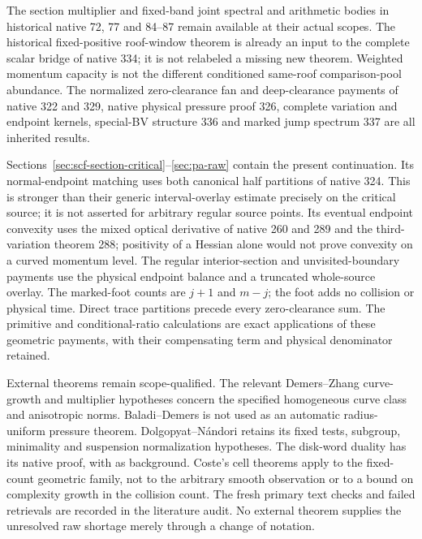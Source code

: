 \documentclass[11pt,reqno]{amsart}
\numberwithin{equation}{section}
\theoremstyle{definition}\newtheorem{definition}[theorem]{Definition}
\theoremstyle{remark}\newtheorem{remark}[theorem]{Remark}
\begin{document}
The section multiplier and fixed-band joint spectral and
arithmetic bodies in historical native 72, 77 and 84--87 remain
available at their actual scopes. The historical fixed-positive
roof-window theorem is already an input to the complete scalar
bridge of native 334; it is not relabeled a missing new theorem.
Weighted momentum capacity is not the different conditioned
same-roof comparison-pool abundance. The normalized
zero-clearance fan and deep-clearance payments of native 322
and 329, native physical pressure proof 326, complete variation
and endpoint kernels, special-BV structure 336 and marked
jump spectrum 337 are all inherited results.

Sections~\ref{sec:scf-section-critical}--\ref{sec:pa-raw}
contain the present continuation. Its normal-endpoint matching
uses both canonical half partitions of native 324. This is
stronger than their generic interval-overlay estimate precisely
on the critical source; it is not asserted for arbitrary
regular source points. Its eventual endpoint convexity uses
the mixed optical derivative of native 260 and 289 and the
third-variation theorem 288; positivity of a Hessian alone
would not prove convexity on a curved momentum level.
The regular interior-section and unvisited-boundary payments
use the physical endpoint balance and a truncated whole-source
overlay. The marked-foot counts are $j+1$ and $m-j$; the foot
adds no collision or physical time. Direct trace partitions
precede every zero-clearance sum. The primitive and
conditional-ratio calculations are exact
applications of these geometric payments, with their
compensating term and physical denominator retained.

External theorems remain scope-qualified. The relevant
Demers--Zhang curve-growth and multiplier hypotheses
\cite{DZUniform} concern the specified homogeneous curve
class and anisotropic norms. Baladi--Demers\cite{BDPressure}
is not used as an automatic radius-uniform pressure theorem.
Dolgopyat--N\'andori\cite{DNFlow} retains its fixed tests,
subgroup, minimality and suspension normalization hypotheses.
The disk-word duality has its native proof, with
\cite{BVNotes} as background. Coste's cell theorems
\cite{CosteOM} apply to the fixed-count geometric family,
not to the arbitrary smooth observation or to a bound on
complexity growth in the collision count. The fresh primary
text checks and failed retrievals are recorded in the
literature audit. No external theorem supplies the unresolved
raw shortage merely through a change of notation.
\end{document}
